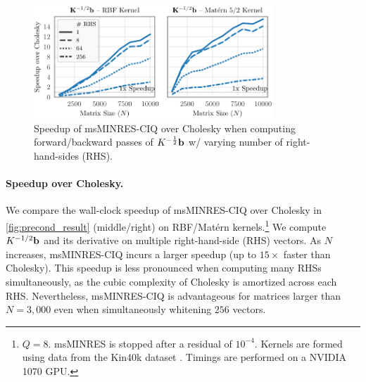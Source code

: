 \begin{figure}[t!]
	\centering
	\includegraphics[width=0.8\textwidth]{figures/timing.pdf}
  \caption[
    Speedup of msMINRES-CIQ over Cholesky.
  ]{
    Speedup of msMINRES-CIQ over Cholesky when computing forward/backward passes of $K^{-\frac 1 2} \mathbf{b}$ w/ varying number of right-hand-sides (RHS).
  }
  \label{fig:timing}
\end{figure}

\paragraph{Speedup over Cholesky.}
We compare the wall-clock speedup of msMINRES-CIQ over Cholesky in \cref{fig:precond_result} (middle/right) on RBF/Mat\'ern kernels.\footnote{
  $Q=8$.
  msMINRES is stopped after a residual of $10^{-4}$.
  Kernels are formed using data from the Kin40k dataset \citep{asuncion2007uci}.
  Timings are performed on a NVIDIA 1070 GPU.
}
We compute $K^{-1/2} \mathbf{b}$ and its derivative on multiple right-hand-side (RHS) vectors.
As $N$ increases, msMINRES-CIQ incurs a larger speedup (up to $15\times$ faster than Cholesky).
This speedup is less pronounced when computing many RHSs simultaneously, as the cubic complexity of Cholesky is amortized across each RHS.
Nevertheless, msMINRES-CIQ is advantageous for matrices larger than $N=3,\!000$ even when simultaneously whitening $256$ vectors.
